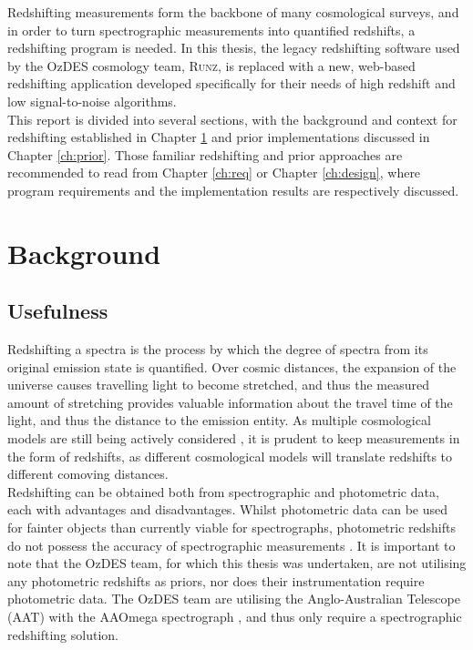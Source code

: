 \documentclass[titlesmallcaps, examinerscopy, copyrightpage]{uqthesis}
\newcommand{\runz}{\textsc{Runz}}
\begin{document}
Redshifting measurements form the backbone of many cosmological surveys, and in order to turn spectrographic measurements into quantified redshifts, a redshifting program is needed. In this thesis, the legacy redshifting software used by the OzDES cosmology team, \runz{}, is replaced with a new, web-based redshifting application developed specifically for their needs of high redshift and low signal-to-noise algorithms.\\

This report is divided into several sections, with the background and context for redshifting established in Chapter \ref{ch:back} and prior implementations discussed in Chapter \ref{ch:prior}. Those familiar redshifting and prior approaches are recommended to read from Chapter \ref{ch:req} or Chapter \ref{ch:design}, where program requirements and the implementation results are respectively discussed.



\chapter{Background}
\label{ch:back}

\section{Usefulness}

Redshifting a spectra is the process by which the degree of spectra from its original emission state is quantified. Over cosmic distances, the expansion of the universe causes travelling light to become stretched, and thus the measured amount of stretching provides valuable information about the travel time of the light, and thus the distance to the emission entity. As multiple cosmological models are still being actively considered \cite{davis2007scrutinizing}, it is prudent to keep measurements in the form of redshifts, as different cosmological models will translate redshifts to different comoving distances.\\

Redshifting can be obtained both from spectrographic and photometric data, each with advantages and disadvantages. Whilst photometric data can be used for fainter objects than currently viable for spectrographs, photometric redshifts do not possess the accuracy of spectrographic measurements \cite{bolzonella2000photometric}. It is important to note that the OzDES team, for which this thesis was undertaken, are not utilising any photometric redshifts as priors, nor does their instrumentation require photometric data. The OzDES team are utilising the Anglo-Australian Telescope (AAT) with the AAOmega spectrograph \cite{d2014ozdes}, and thus only require a spectrographic redshifting solution.
\end{document}
